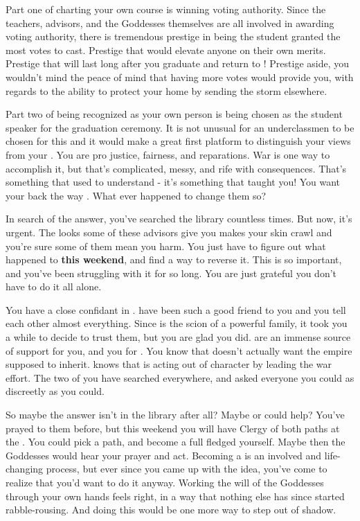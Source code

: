 \documentclass[char]{GL2020}
\begin{document}
Part one of charting your own course is winning voting authority. Since the teachers, advisors, and the Goddesses themselves are all involved in awarding voting authority, there is tremendous prestige in being the student granted the most votes to cast. Prestige that would elevate anyone on their own merits. Prestige that will last long after you graduate and return to \pShip{}! Prestige aside, you wouldn’t mind the peace of mind that having more votes would provide you, with regards to the ability to protect your home by sending the storm elsewhere.

Part two of being recognized as your own person is being chosen as the student speaker for the graduation ceremony. It is not unusual for an underclassmen to be chosen for this and it would make a great first platform to distinguish your views from your \cLoud{\parent}. You are pro justice, fairness, and reparations. War is one way to accomplish it, but that’s complicated, messy, and rife with consequences. That’s something that \cLoud{} used to understand - it’s something that \cLoud{\they} taught you! You want your \cLoud{\parent} back the way \cLoud{\they} \cLoud{\were}. What ever happened to change them so?

In search of the answer, you’ve searched the library countless times. But now, it’s urgent. The looks some of these advisors give you makes your skin crawl and you’re sure some of them mean you harm. You just have to figure out what happened to \cLoud{} \textbf{this weekend}, and find a way to reverse it. This is so important, and you’ve been struggling with it for so long. You are just grateful you don’t have to do it all alone.

You have a close confidant in \cHeir{}. \cHeir{\They} have been such a good friend to you and you tell each other almost everything. Since \cHeir{} is the scion of a powerful \pTech{} family, it took you a while to decide to trust them, but you are glad you did. \cHeir{\They} are an immense source of support for you, and you for \cHeir{\them}. You know that \cHeir{} doesn’t actually want the empire \cHeir{\they} \cHeir{\are} supposed to inherit. \cHeir{} knows that \cLoud{} is acting out of character by leading the war effort. The two of you have searched everywhere, and asked everyone you could as discreetly as you could.

So maybe the answer isn’t in the library after all? Maybe \cEbb{} or \cFlow{} could help? You’ve prayed to them before, but this weekend you will have Clergy of both paths at the \pSc{}. You could pick a path, and become a full fledged \cWarlordDaughter{\cleric} yourself. Maybe then the Goddesses would hear your prayer and act. Becoming a \cWarlordDaughter{\cleric} is an involved and life-changing process, but ever since you came up with the idea, you’ve come to realize that you’d want to do it anyway. Working the will of the Goddesses through your own hands feels right, in a way that nothing else has since \cLoud{} started rabble-rousing. And doing this would be one more way to step out of \cLoud{\their} shadow.
\end{document}
